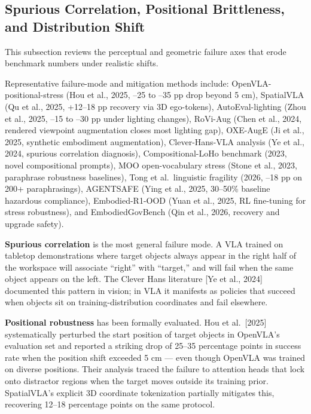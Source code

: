 \documentclass{article}
\begin{document}
\subsection{Spurious Correlation, Positional Brittleness, and Distribution Shift}\label{spurious-correlation-positional-brittleness-and-distribution-shift}

This subsection reviews the perceptual and geometric failure axes that erode benchmark numbers under realistic shifts.

Representative failure-mode and mitigation methods include: OpenVLA-positional-stress (Hou et al., 2025, --25 to --35 pp drop beyond 5 cm), SpatialVLA (Qu et al., 2025, +12--18 pp recovery via 3D ego-tokens), AutoEval-lighting (Zhou et al., 2025, --15 to --30 pp under lighting changes), RoVi-Aug (Chen et al., 2024, rendered viewpoint augmentation closes most lighting gap), OXE-AugE (Ji et al., 2025, synthetic embodiment augmentation), Clever-Hans-VLA analysis (Ye et al., 2024, spurious correlation diagnosis), Compositional-LoHo benchmark (2023, novel compositional prompts), MOO open-vocabulary stress (Stone et al., 2023, paraphrase robustness baselines), Tong et al.~linguistic fragility (2026, --18 pp on 200+ paraphrasings), AGENTSAFE (Ying et al., 2025, 30--50\% baseline hazardous compliance), Embodied-R1-OOD (Yuan et al., 2025, RL fine-tuning for stress robustness), and EmbodiedGovBench (Qin et al., 2026, recovery and upgrade safety).

\textbf{Spurious correlation} is the most general failure mode. A VLA trained on tabletop demonstrations where target objects always appear in the right half of the workspace will associate ``right'' with ``target,'' and will fail when the same object appears on the left. The Clever Hans literature {[}Ye et al., 2024{]} documented this pattern in vision; in VLA it manifests as policies that succeed when objects sit on training-distribution coordinates and fail elsewhere.

\textbf{Positional robustness} has been formally evaluated. Hou et al.~{[}2025{]} systematically perturbed the start position of target objects in OpenVLA's evaluation set and reported a striking drop of 25--35 percentage points in success rate when the position shift exceeded 5 cm --- even though OpenVLA was trained on diverse positions. Their analysis traced the failure to attention heads that lock onto distractor regions when the target moves outside its training prior. SpatialVLA's explicit 3D coordinate tokenization \cite{qu2025spatialvlaexplorin} partially mitigates this, recovering 12--18 percentage points on the same protocol.
\end{document}
